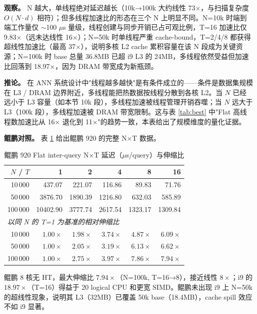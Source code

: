 \documentclass[a4paper,11pt,UTF8]{ctexart}
\begin{document}
\textbf{观察。} N 越大，单线程绝对延迟越长（10k→100k 大约线性 73$\times$，与扫描复杂度 $O(N\cdot d)$ 相符）；但多线程加速比的形态在三个 N 上明显不同。N=10k 时端到端工作量仅 $\sim$100 $\mu$s 量级，线程创建与同步开销已占可观比例，T=16 加速比仅 9.83$\times$（远未达线性 16$\times$）；N=50k 时单线程严重 cache-bound，T=2/4/8 都获得超线性加速比（最高 37$\times$），说明多核 L2 cache 累积容量在该 N 段成为关键资源；N=100k 时 base 总量 36.8MB 已超 i9 L3 的 24MB，多线程依然受益但加速比回落到 18.97$\times$，因为 DRAM 带宽成为新瓶颈。

\textbf{推论。} 在 ANN 系统设计中"线程越多越快"是有条件成立的——条件是数据集规模在 L3 / DRAM 边界附近，多线程能把热数据按线程分散到各核 L2。当 $N$ 已经远小于 L3 容量（如本节 10k 段），多线程加速被线程管理开销吞噬；当 $N$ 远大于 L3（100k 段），多线程加速被 DRAM 带宽限制。这与表 \ref{tab:best} 中"Flat 高线程数加速比从 16$\times$ 退化到 11$\times$"的趋势一致，本表给出了规模维度的量化证据。

\textbf{鲲鹏对照。} 表 \ref{tab:n_t_sweep_kunpeng} 给出鲲鹏 920 的完整 N×T 数据。

\begin{table}[H]
  \centering\small
  \begin{tabular}{rrrrrr}
    \toprule
    $N$ / $T$ & 1 & 2 & 4 & 8 & 16 \\
    \midrule
    10\,000   & 437.07 & 221.07 & 116.86 & 89.83 & 71.76 \\
    50\,000   & 3876.70 & 1890.39 & 1216.80 & 632.03 & 585.89 \\
    100\,000  & 10402.90 & 3777.74 & 2617.54 & 1323.17 & 1309.84 \\
    \midrule
    \multicolumn{6}{l}{\textit{以同 N 的 T=1 为基准的相对伸缩比}} \\
    \midrule
    10\,000  & $1.00\times$ & $1.98\times$ & $3.74\times$ & $4.87\times$ & $6.09\times$ \\
    50\,000  & $1.00\times$ & $2.05\times$ & $3.19\times$ & $6.13\times$ & $6.62\times$ \\
    100\,000 & $1.00\times$ & $2.75\times$ & $3.97\times$ & $7.86\times$ & $7.94\times$ \\
    \bottomrule
  \end{tabular}
  \caption{鲲鹏 920 Flat inter-query N×T 延迟（$\mu$s/query）与伸缩比}
  \label{tab:n_t_sweep_kunpeng}
\end{table}

鲲鹏 8 核无 HT，最大伸缩比 $7.94\times$（N=100k, T=16→8），接近线性 $8\times$；i9 的 $18.97\times$（T=16）得益于 20 logical CPU 和更宽 SIMD。鲲鹏未出现 i9 上 N=50k 的超线性现象，说明其 L3（32MB）已覆盖 50k base（18.4MB），cache spill 效应不如 i9 显著。
\end{document}
